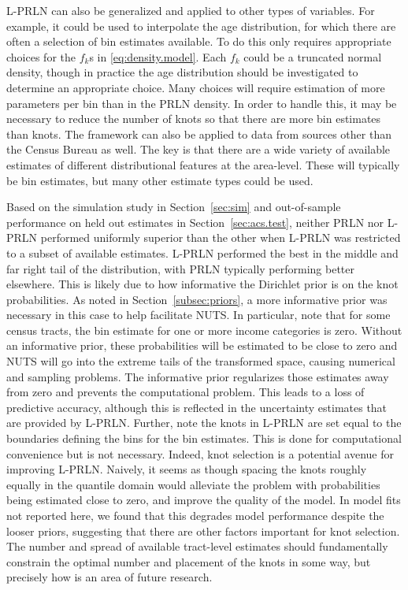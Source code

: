 \documentclass[12pt]{article}
\begin{document}
L-PRLN can also be generalized and applied to other types of variables. For example, it could be used to interpolate the age distribution, for which there are often a selection of bin estimates available. To do this only requires appropriate choices for the $f_k$s in \eqref{eq:density.model}. Each $f_k$ could be a truncated normal density, though in practice the age distribution should be investigated to determine an appropriate choice. Many choices will require estimation of more parameters per bin than in the PRLN density. In order to handle this, it may be necessary to reduce the number of knots so that there are more bin estimates than knots. The framework can also be applied to data from sources other than the Census Bureau as well. The key is that there are a wide variety of available estimates of different distributional features at the area-level. These will typically be bin estimates, but many other estimate types could be used.

Based on the simulation study in Section~\ref{sec:sim} and out-of-sample performance on held out estimates in Section~\ref{sec:acs.test}, neither PRLN nor L-PRLN performed uniformly superior than the other when L-PRLN was restricted to a subset of available estimates. L-PRLN performed the best in the middle and far right tail of the distribution, with PRLN typically performing better elsewhere. This is likely due to how informative the Dirichlet prior is on the knot probabilities. As noted in Section~\ref{subsec:priors}, a more informative prior was necessary in this case to help facilitate NUTS.  In particular, note that for some census tracts, the bin estimate for one or more income categories is zero. Without an informative prior, these probabilities will be estimated to be close to zero and NUTS will go into the extreme tails of the transformed space, causing numerical and sampling problems. The informative prior regularizes those estimates away from zero and prevents the computational problem.  This leads to a loss of predictive accuracy, although this is reflected in the uncertainty estimates that are provided by L-PRLN.  Further, note the knots in L-PRLN are set equal to the boundaries defining the bins for the bin estimates.  This is done for computational convenience but is not necessary. Indeed, knot selection is a potential avenue for improving L-PRLN. Naively, it seems as though spacing the knots roughly equally in the quantile domain would alleviate the problem with probabilities being estimated close to zero, and improve the quality of the model. In model fits not reported here, we found that this degrades model performance despite the looser priors, suggesting that there are other factors important for knot selection. The number and spread of available tract-level estimates should fundamentally constrain the optimal number and placement of the knots in some way, but precisely how is an area of future research.
\end{document}
